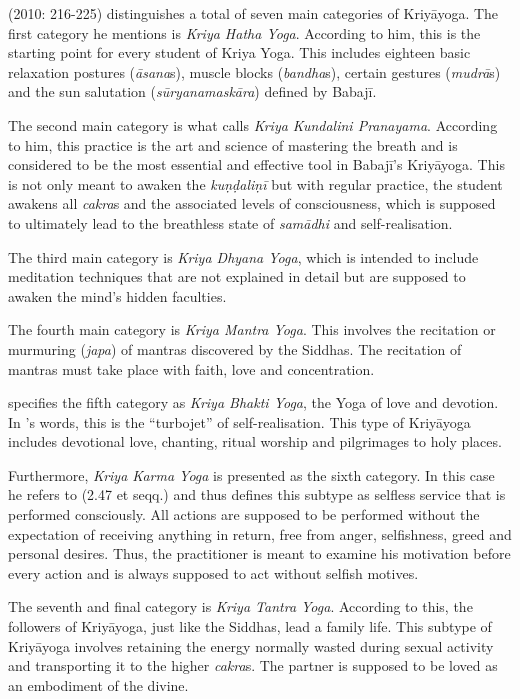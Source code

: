 \citeauthor{govindan2010} (2010: 216-225) distinguishes a total of seven main categories of Kriyāyoga. The first category he mentions is \textit{Kriya Hatha Yoga}. According to him, this is the starting point for every student of Kriya Yoga. This includes eighteen basic relaxation postures (\textit{āsana}s), muscle blocks (\textit{bandha}s), certain gestures (\textit{mudrā}s) and the sun salutation (\textit{sūryanamaskāra}) defined by Babajī.

The second main category is what \citeauthor{govindan2010} calls \textit{Kriya Kundalini Pranayama}. According to him, this practice is the art and science of mastering the breath and is considered to be the most essential and effective tool in Babajī's Kriyāyoga. This is not only meant to awaken the \textit{kuṇḍaliṇī} but with regular practice, the student awakens all \textit{cakra}s and the associated levels of consciousness, which is supposed to ultimately lead to the breathless state of \textit{samādhi} and self-realisation.

The third main category is \textit{Kriya Dhyana Yoga}, which is intended to include meditation techniques that are not explained in detail but are supposed to awaken the mind's hidden faculties.

The fourth main category is \textit{Kriya Mantra Yoga}. This involves the recitation or murmuring (\textit{japa}) of mantras discovered by the Siddhas. The recitation of mantras must take place with faith, love and concentration.

\citeauthor{govindan2010} specifies the fifth category as \textit{Kriya Bhakti Yoga}, the Yoga of love and devotion. In \citeauthor{govindan2010}'s words, this is the ``turbojet'' of self-realisation. This type of Kriyāyoga includes devotional love, chanting, ritual worship and pilgrimages to holy places.

Furthermore, \textit{Kriya Karma Yoga} is presented as the sixth category. In this case he refers to  (2.47 et seqq.) and thus defines this subtype as selfless service that is performed consciously. All actions are supposed to be performed without the expectation of receiving anything in return, free from anger, selfishness, greed and personal desires. Thus, the practitioner is meant to examine his motivation before every action and is always supposed to act without selfish motives.

The seventh and final category is \textit{Kriya Tantra Yoga}. According to this, the followers of Kriyāyoga, just like the Siddhas, lead a family life. This subtype of Kriyāyoga involves retaining the energy normally wasted during sexual activity and transporting it to the higher \textit{cakra}s. The partner is supposed to be loved as an embodiment of the divine.


